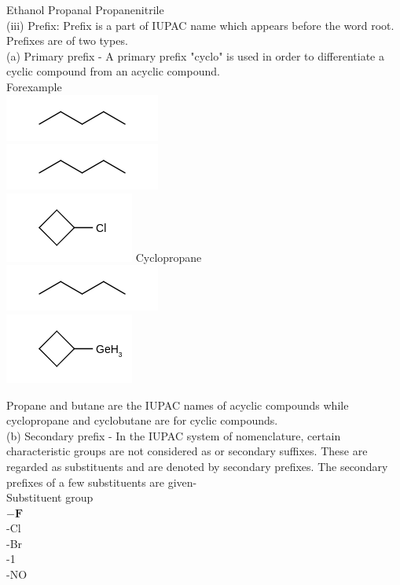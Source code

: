 \documentclass[10pt]{article}
\begin{document}
Ethanol Propanal Propanenitrile\\
(iii) Prefix: Prefix is a part of IUPAC name which appears before the word root. Prefixes are of two types.\\
(a) Primary prefix - A primary prefix "cyclo" is used in order to differentiate a cyclic compound from an acyclic compound.\\
Forexample\\
\includegraphics{smile-adc1043f9808a213f19713fd996d43157af628f7}\\
\includegraphics{smile-7b20b37ab8915e7e5ca12c21028a04d40db61998}\\
\includegraphics{smile-955b5b1baa4d3faaa2d6370b3bf55a03172e96d4} Cyclopropane\\
\includegraphics{smile-29af6c8e54407dab63d8ce9c28f1a2aecd27c962}\\
\includegraphics{smile-7a33fdfe40081e4a35b1902dc24f1973a2d2b4fd}

Propane and butane are the IUPAC names of acyclic compounds while cyclopropane and cyclobutane are for cyclic compounds.\\
(b) Secondary prefix - In the IUPAC system of nomenclature, certain characteristic groups are not considered as or secondary suffixes. These are regarded as substituents and are denoted by secondary prefixes. The secondary prefixes of a few substituents are given-\\
Substituent group\\
$-\mathbf{F}$\\
-Cl\\
-Br\\
-1\\
-NO
\end{document}

